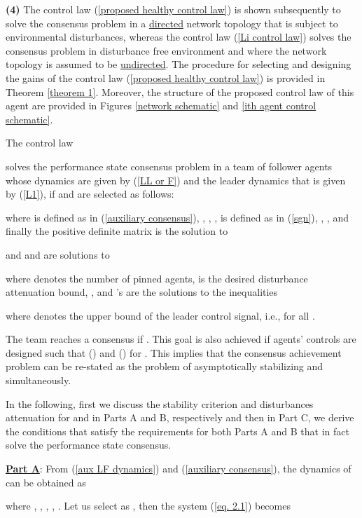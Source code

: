 \documentclass[12pt,draftcls,onecolumn]{IEEEtran}
\begin{document}
 \textbf{(4)} The control law (\ref{proposed healthy control law}) is shown subsequently to solve the consensus problem in a \underline{directed} network topology that is {subject to environmental disturbances}, whereas the control law (\ref{Li control law}) solves the consensus problem in {disturbance free} environment and where the network topology is assumed to be \underline{undirected}. The procedure for selecting and designing the gains of the control law (\ref{proposed healthy control law}) is provided in Theorem \ref{theorem 1}.  Moreover, 
the structure of the proposed control law of this agent are provided in Figures \ref{network schematic} and \ref{ith agent control schematic}. \begin{theorems}\label{theorem 1}
	The control law 
	
	 solves the  performance state consensus problem in a team of  follower agents whose dynamics are given by (\ref{LL or F}) and the leader dynamics that is given by (\ref{L1}), if  and  are selected as follows:
	
	 where  is  defined as in (\ref{auxiliary consensus}), 
	, , ,  is  defined as in (\ref{sgn}), ,   , and finally the positive definite matrix  is the solution to
	
	and  and  are solutions to
	
	where  denotes the number of pinned agents,  is the desired disturbance attenuation bound,  ,   
	and 's are the solutions to the inequalities
	
	where  denotes the upper bound of the leader control signal, i.e.,  for all .
\end{theorems}
\proof
The team reaches a consensus if . This goal is also achieved if agents' controls are designed such that  () and  () for . 
This implies that the consensus achievement problem can be re-stated as  the problem of asymptotically stabilizing  
 and  simultaneously. \par
In the following, first we discuss the stability criterion and disturbances attenuation for   and  in Parts A and B, respectively and  then in Part C, we derive the conditions that  satisfy the requirements for both Parts A and B that in fact solve the  performance state consensus.\par
\underline{\textbf{Part A}}: From  (\ref{aux LF dynamics}) and (\ref{auxiliary consensus}), the dynamics of  can be obtained as 

where  , , , , . Let us select   as , then the system (\ref{eq. 2.1}) becomes
\end{document}
